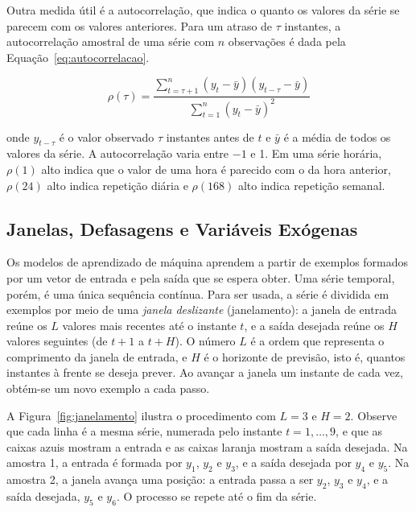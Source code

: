 Outra medida útil é a autocorrelação, que indica o quanto os valores da série se parecem com os valores anteriores. Para um atraso de \(\tau\) instantes, a autocorrelação amostral de uma série com \(n\) observações é dada pela Equação~\ref{eq:autocorrelacao}.

\begin{equation}
    \rho(\tau)=
    \frac{
        \sum_{t=\tau+1}^{n} (y_t-\bar{y})(y_{t-\tau}-\bar{y})
    }{
        \sum_{t=1}^{n} (y_t-\bar{y})^2
    }
    \label{eq:autocorrelacao}
\end{equation}

\noindent onde \(y_{t-\tau}\) é o valor observado \(\tau\) instantes antes de \(t\) e \(\bar{y}\) é a média de todos os valores da série. A autocorrelação varia entre \(-1\) e 1. Em uma série horária, \(\rho(1)\) alto indica que o valor de uma hora é parecido com o da hora anterior, \(\rho(24)\) alto indica repetição diária e \(\rho(168)\) alto indica repetição semanal.

\subsection{Janelas, Defasagens e Variáveis Exógenas}
\label{sec:janelas_variaveis_exogenas}

Os modelos de aprendizado de máquina aprendem a partir de exemplos formados por um vetor de entrada e pela saída que se espera obter. Uma série temporal, porém, é uma única sequência contínua. Para ser usada, a série é dividida em exemplos por meio de uma \emph{janela deslizante} (janelamento): a janela de entrada reúne os \(L\) valores mais recentes até o instante \(t\), e a saída desejada reúne os \(H\) valores seguintes (de \(t+1\) a \(t+H\)). O número \(L\) é a ordem que representa o comprimento da janela de entrada, e \(H\) é o horizonte de previsão, isto é, quantos instantes à frente se deseja prever. Ao avançar a janela um instante de cada vez, obtém-se um novo exemplo a cada passo.

A Figura~\ref{fig:janelamento} ilustra o procedimento com \(L=3\) e \(H=2\). Observe que cada linha é a mesma série, numerada pelo instante \(t=1,\ldots,9\), e que as caixas azuis mostram a entrada e as caixas laranja mostram a saída desejada. Na amostra 1, a entrada é formada por \(y_1\), \(y_2\) e \(y_3\), e a saída desejada por \(y_4\) e \(y_5\). Na amostra 2, a janela avança uma posição: a entrada passa a ser \(y_2\), \(y_3\) e \(y_4\), e a saída desejada, \(y_5\) e \(y_6\). O processo se repete até o fim da série.

